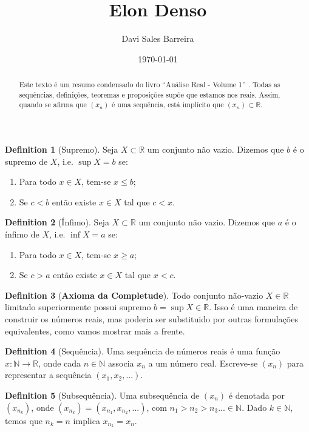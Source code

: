 \documentclass[10pt]{article}
\title{Elon Denso}
\author{Davi Sales Barreira}
\date{\today}
\theoremstyle{definition}
\newtheorem{definition}{Definition}[section]
\begin{document}
\maketitle
\begin{abstract}
	Este texto é um resumo condensado do livro ``Análise Real - Volume 1''
	\citep{lima2004analise}. Todas as sequências, definições, teoremas e proposições
	supõe que estamos nos reais. Assim, quando se afirma que $(x_n)$ é uma sequência,
	está implícito que $(x_n) \subset \mathbb R$.
\end{abstract}
\begin{definition}[Supremo]
	Seja $X \subset \mathbb R$ um conjunto não vazio. Dizemos que
	$b$ é o supremo de $X$, i.e. $\sup X = b$ se:
	\begin{enumerate}
		\item Para todo $x \in X$, tem-se $x \leq b$;
		\item Se $c<b$ então existe $x \in X$ tal que $c<x$.
	\end{enumerate}
\end{definition}

\begin{definition}[Ínfimo]
	Seja $X \subset \mathbb R$ um conjunto não vazio. Dizemos que
	$a$ é o ínfimo de $X$, i.e. $\inf X = a$ se:
	\begin{enumerate}
		\item Para todo $x \in X$, tem-se $x \geq a$;
		\item Se $c>a$ então existe $x \in X$ tal que $x<c$.
	\end{enumerate}
\end{definition}

\begin{definition}[\textbf{Axioma da Completude}]
	Todo conjunto não-vazio $X \in \mathbb R$ limitado superiormente possui
	supremo $b = \sup X \in \mathbb R$. Isso é uma maneira de construir os números reais,
	mas poderia ser substituido por outras formulações equivalentes, como vamos mostrar mais a frente.
\end{definition}

\begin{definition}[Sequência]
	Uma sequência de números reais é uma função $x: \mathbb N \to \mathbb R$,
	onde cada $n \in \mathbb N$ associa $x_n$ a um número real. Escreve-se
	$(x_n)$ para representar a sequência $(x_1,x_2,...)$.
\end{definition}

\begin{definition}[Subsequência]
	Uma subsequência de $(x_n)$ é denotada por $(x_{n_k})$, onde
	$(x_{n_k}) = (x_{n_1},x_{n_2},...)$, com $n_1 > n_2 > n_3 ... \in \mathbb N$.
	Dado $k \in \mathbb N$, temos que $n_k = n$ implica $x_{n_k} = x_n$.
\end{definition}
\end{document}
